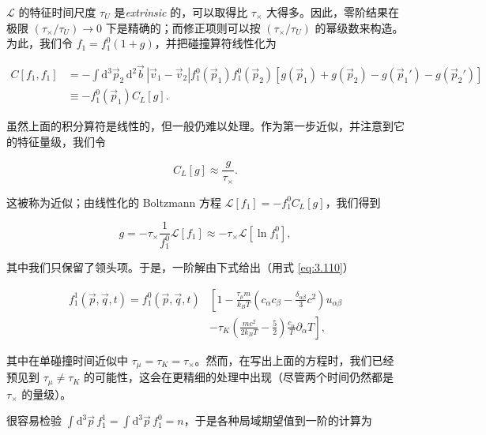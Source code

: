 $\mathscr L$ 的特征时间尺度 $\tau_U$ 是\textit{extrinsic} 的，可以取得比 $\tau_\times$ 大得多。因此，零阶结果在极限 $(\tau_\times/\tau_U)\to0$ 下是精确的；而修正项则可以按 $(\tau_\times/\tau_U)$ 的幂级数来构造。为此，我们令 $f_1=f_1^0(1+g)$，并把碰撞算符线性化为

\begin{equation}\label{eq:3.111}
  \begin{aligned}
    C[f_1,f_1]&=-\int \mathrm{d}^3\vec p_2\,\mathrm{d}^2\vec b\,|\vec v_1-\vec v_2|f_1^0(\vec p_1)f_1^0(\vec p_2)\left[g(\vec p_1)+g(\vec p_2)-g(\vec p_1{}')-g(\vec p_2{}')\right]\\
    &\equiv-f_1^0(\vec p_1)C_L[g].
  \end{aligned}
\end{equation}

虽然上面的积分算符是线性的，但一般仍难以处理。作为第一步近似，并注意到它的特征量级，我们令

\begin{equation}\label{eq:3.112}
  C_L[g]\approx\frac{g}{\tau_\times}.
\end{equation}

这被称为近似；由线性化的 Boltzmann 方程 $\mathscr L[f_1]=-f_1^0C_L[g]$，我们得到

\begin{equation}\label{eq:3.113}
  g=-\tau_\times\frac{1}{f_1^0}\mathscr L[f_1]\approx-\tau_\times\mathscr L\left[\ln f_1^0\right],
\end{equation}

其中我们只保留了领头项。于是，一阶解由下式给出（用式 \eqref{eq:3.110}）

\begin{equation}\label{eq:3.114}
  \begin{aligned}
    f_1^1(\vec p,\vec q,t)=f_1^0(\vec p,\vec q,t)&\left[1-\frac{\tau_\mu m}{k_BT}\left(c_\alpha c_\beta-\frac{\delta_{\alpha\beta}}{3}c^2\right)u_{\alpha\beta}\right.\\
    &\left.-\tau_K\left(\frac{mc^2}{2k_BT}-\frac{5}{2}\right)\frac{c_\alpha}{T}\partial_\alpha T\right],
  \end{aligned}
\end{equation}

其中在单碰撞时间近似中 $\tau_\mu=\tau_K=\tau_\times$。然而，在写出上面的方程时，我们已经预见到 $\tau_\mu\ne\tau_K$ 的可能性，这会在更精细的处理中出现（尽管两个时间仍然都是 $\tau_\times$ 的量级）。

很容易检验 $\int \mathrm{d}^3\vec p\,f_1^1=\int \mathrm{d}^3\vec p\,f_1^0=n$，于是各种局域期望值到一阶的计算为

